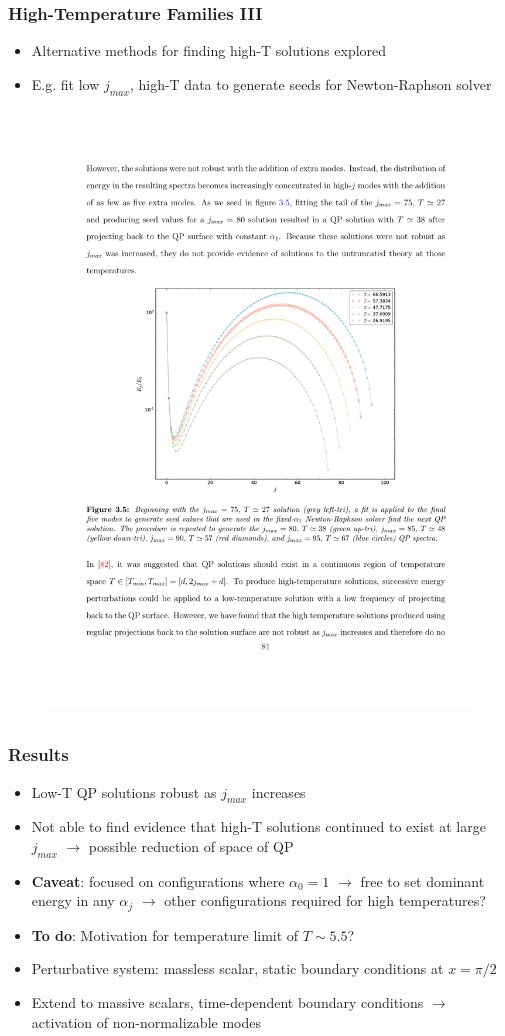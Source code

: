 \documentclass[mathserif,10pt]{beamer}
\newcommand{\bi}{\begin{itemize}}
\newcommand{\ei}{\end{itemize}}
\newcommand{\its}{\item}
\newcommand{\jm}{j_{max}}
\begin{document}
{\frame
{
  \frametitle{High-Temperature Families III}
  \bi
  \its Alternative methods for finding high-T solutions explored 
  \its E.g. fit low $\jm$, high-T data to generate seeds for Newton-Raphson solver
     \ei
   \begin{overlayarea}{\textwidth}{0.65\textheight}
      \begin{figure}
      \centering
      \vspace{-0.13in}
      \includegraphics[scale=0.6]{highTseeds}
      \end{figure}
  \end{overlayarea}
}


\subsection*{}
\frame
{
  \frametitle{Results}
    \bi
    \its Low-T QP solutions robust as $\jm$ increases
    \its Not able to find evidence that high-T solutions continued to exist at large $\jm$ $\to$ possible reduction of space of QP
    \its {\bf Caveat}: focused on configurations where $\alpha_0 = 1$ $\to$ free to set dominant energy in any $\alpha_j$ $\to$ other configurations required for high temperatures?
    \its {\bf To do}: Motivation for temperature limit of $T \sim 5.5$?
    \its Perturbative system: massless scalar, static boundary conditions at $x = \pi/2$
    \its Extend to massive scalars, time-dependent boundary conditions $\to$ activation of non-normalizable modes
    \ei
}

}
\end{document}
